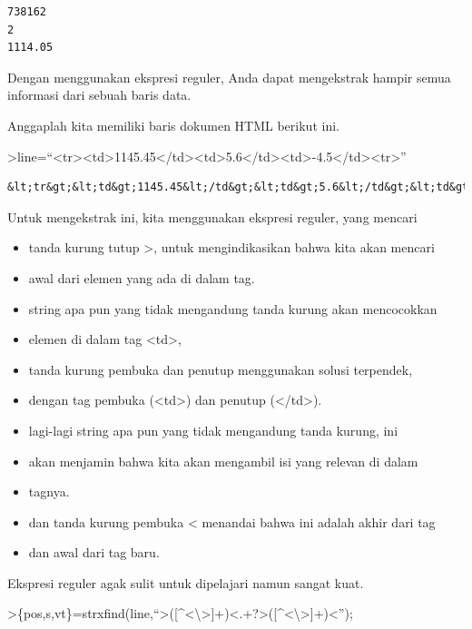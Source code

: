\documentclass[
]{book}
\begin{document}
\begin{verbatim}
738162
2
1114.05
\end{verbatim}

Dengan menggunakan ekspresi reguler, Anda dapat mengekstrak hampir semua informasi dari sebuah baris data.

Anggaplah kita memiliki baris dokumen HTML berikut ini.

\textgreater line=``\textless tr\textgreater\textless td\textgreater1145.45\textless/td\textgreater\textless td\textgreater5.6\textless/td\textgreater\textless td\textgreater-4.5\textless/td\textgreater\textless tr\textgreater{}''

\begin{verbatim}
&lt;tr&gt;&lt;td&gt;1145.45&lt;/td&gt;&lt;td&gt;5.6&lt;/td&gt;&lt;td&gt;-4.5&lt;/td&gt;&lt;tr&gt;
\end{verbatim}

Untuk mengekstrak ini, kita menggunakan ekspresi reguler, yang mencari

\begin{itemize}
\item
  tanda kurung tutup \textgreater, untuk mengindikasikan bahwa kita akan mencari
\item
  awal dari elemen yang ada di dalam tag.
\item
  string apa pun yang tidak mengandung tanda kurung akan mencocokkan
\item
  elemen di dalam tag \textless td\textgreater,
\item
  tanda kurung pembuka dan penutup menggunakan solusi terpendek,
\item
  dengan tag pembuka (\textless td\textgreater) dan penutup (\textless/td\textgreater).
\item
  lagi-lagi string apa pun yang tidak mengandung tanda kurung, ini
\item
  akan menjamin bahwa kita akan mengambil isi yang relevan di dalam
\item
  tagnya.
\item
  dan tanda kurung pembuka \textless{} menandai bahwa ini adalah akhir dari tag
\item
  dan awal dari tag baru.
\end{itemize}

Ekspresi reguler agak sulit untuk dipelajari namun sangat kuat.

\textgreater\{pos,s,vt\}=strxfind(line,``\textgreater({[}\^{}\textless\textbackslash\textgreater{]}+)\textless.+?\textgreater({[}\^{}\textless\textbackslash\textgreater{]}+)\textless{}'');
\end{document}
